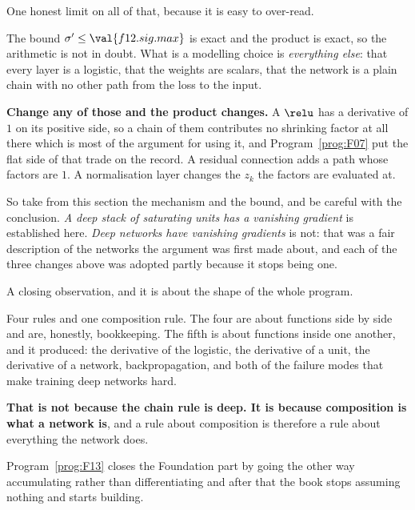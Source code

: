 \begin{fr}
One honest limit on all of that, because it is easy to over-read.

The bound $\sigma' \le \val{f12.sig.max}$ is exact and the product is exact,
so the arithmetic is not in doubt. What is a modelling choice is
\emph{everything else}: that every layer is a logistic, that the weights are
scalars, that the network is a plain chain with no other path from the loss to
the input.

\textbf{Change any of those and the product changes.} A $\relu$ has a
derivative of $1$ on its positive side, so a chain of them contributes no
shrinking factor at all there \dash{} which is most of the argument for using
it, and Program~\ref{prog:F07} put the flat side of that trade on the record.
A residual connection adds a path whose factors are $1$. A normalisation layer
changes the $z_k$ the factors are evaluated at.

So take from this section the mechanism and the bound, and be careful with the
conclusion. \emph{A deep stack of saturating units has a vanishing gradient}
is established here. \emph{Deep networks have vanishing gradients} is not:
that was a fair description of the networks the argument was first made about,
and each of the three changes above was adopted partly because it stops being
one.
\end{fr}

\begin{fr}
A closing observation, and it is about the shape of the whole program.

Four rules and one composition rule. The four are about functions side by
side and are, honestly, bookkeeping. The fifth is about functions inside one
another, and it produced: the derivative of the logistic, the derivative of a
unit, the derivative of a network, backpropagation, and both of the failure
modes that make training deep networks hard.

\textbf{That is not because the chain rule is deep. It is because composition
is what a network is}, and a rule about composition is therefore a rule about
everything the network does.

Program~\ref{prog:F13} closes the Foundation part by going the other way
\dash{} accumulating rather than differentiating \dash{} and after that the
book stops assuming nothing and starts building.
\end{fr}


